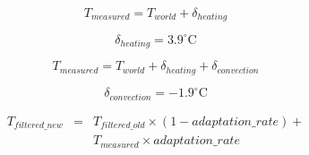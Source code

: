 \documentclass{article}
\begin{document}
\begin{equation}
T_{measured} = T_{world} + \delta_{heating} 
\end{equation}

\begin{equation}
\delta_{heating} = 3.9 ^ \circ \mbox{C} 
\end{equation}

\begin{equation}
T_{measured} = T_{world} + \delta_{heating} + \delta_{convection}
\end{equation}

\begin{equation}
\delta_{convection} = -1.9 ^ \circ \mbox{C} 
\end{equation}

\begin{eqnarray}
T_{filtered\_ new} &=& T_{filtered\_old} \times (1 - adaptation\_rate) + \\
&& T_{measured} \times adaptation\_rate 
\end{eqnarray}
\end{document}
